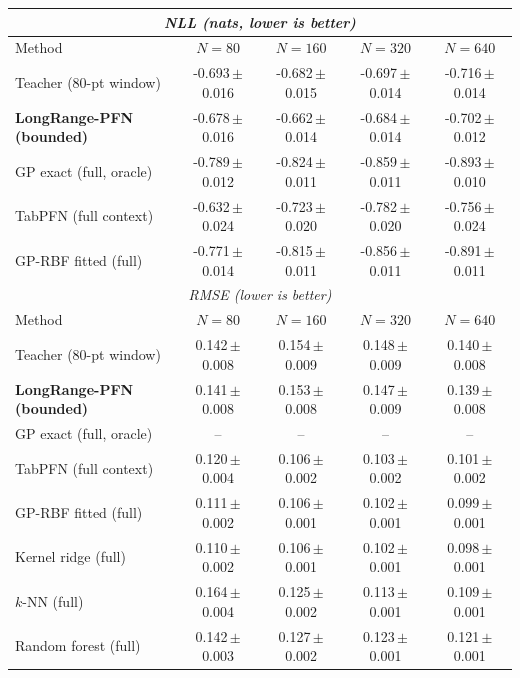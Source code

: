 \begin{tabular}{lcccc}
\toprule
\multicolumn{5}{c}{\emph{NLL (nats, lower is better)}}\\
\midrule
Method & $N=80$ & $N=160$ & $N=320$ & $N=640$\\
\midrule
Teacher (80-pt window) & -0.693\,{\scriptsize$\pm$0.016} & -0.682\,{\scriptsize$\pm$0.015} & -0.697\,{\scriptsize$\pm$0.014} & -0.716\,{\scriptsize$\pm$0.014}\\
\textbf{LongRange-PFN (bounded)} & -0.678\,{\scriptsize$\pm$0.016} & -0.662\,{\scriptsize$\pm$0.014} & -0.684\,{\scriptsize$\pm$0.014} & -0.702\,{\scriptsize$\pm$0.012}\\
GP exact (full, oracle) & -0.789\,{\scriptsize$\pm$0.012} & -0.824\,{\scriptsize$\pm$0.011} & -0.859\,{\scriptsize$\pm$0.011} & -0.893\,{\scriptsize$\pm$0.010}\\
TabPFN (full context) & -0.632\,{\scriptsize$\pm$0.024} & -0.723\,{\scriptsize$\pm$0.020} & -0.782\,{\scriptsize$\pm$0.020} & -0.756\,{\scriptsize$\pm$0.024}\\
GP-RBF fitted (full) & -0.771\,{\scriptsize$\pm$0.014} & -0.815\,{\scriptsize$\pm$0.011} & -0.856\,{\scriptsize$\pm$0.011} & -0.891\,{\scriptsize$\pm$0.011}\\
\midrule
\multicolumn{5}{c}{\emph{RMSE (lower is better)}}\\
\midrule
Method & $N=80$ & $N=160$ & $N=320$ & $N=640$\\
\midrule
Teacher (80-pt window) & 0.142\,{\scriptsize$\pm$0.008} & 0.154\,{\scriptsize$\pm$0.009} & 0.148\,{\scriptsize$\pm$0.009} & 0.140\,{\scriptsize$\pm$0.008}\\
\textbf{LongRange-PFN (bounded)} & 0.141\,{\scriptsize$\pm$0.008} & 0.153\,{\scriptsize$\pm$0.008} & 0.147\,{\scriptsize$\pm$0.009} & 0.139\,{\scriptsize$\pm$0.008}\\
GP exact (full, oracle) & -- & -- & -- & --\\
TabPFN (full context) & 0.120\,{\scriptsize$\pm$0.004} & 0.106\,{\scriptsize$\pm$0.002} & 0.103\,{\scriptsize$\pm$0.002} & 0.101\,{\scriptsize$\pm$0.002}\\
GP-RBF fitted (full) & 0.111\,{\scriptsize$\pm$0.002} & 0.106\,{\scriptsize$\pm$0.001} & 0.102\,{\scriptsize$\pm$0.001} & 0.099\,{\scriptsize$\pm$0.001}\\
Kernel ridge (full) & 0.110\,{\scriptsize$\pm$0.002} & 0.106\,{\scriptsize$\pm$0.001} & 0.102\,{\scriptsize$\pm$0.001} & 0.098\,{\scriptsize$\pm$0.001}\\
$k$-NN (full) & 0.164\,{\scriptsize$\pm$0.004} & 0.125\,{\scriptsize$\pm$0.002} & 0.113\,{\scriptsize$\pm$0.001} & 0.109\,{\scriptsize$\pm$0.001}\\
Random forest (full) & 0.142\,{\scriptsize$\pm$0.003} & 0.127\,{\scriptsize$\pm$0.002} & 0.123\,{\scriptsize$\pm$0.001} & 0.121\,{\scriptsize$\pm$0.001}\\
\bottomrule
\end{tabular}
